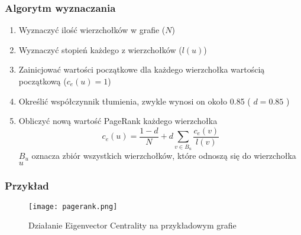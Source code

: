 \subsubsection{Algorytm wyznaczania}
\begin{enumerate}
\item Wyznaczyć ilość wierzchołków w grafie ($N$)
\item Wyznaczyć stopień każdego z wierzchołków ($l(u)$)
\item Zainicjować wartości początkowe dla każdego wierzchołka wartością początkową ($c_e(u) = 1$)
\item Określić współczynnik tłumienia, zwykle wynosi on około 0.85 ( $d = 0.85$ )
\item Obliczyć nową wartość PageRank każdego wierzchołka $$ c_e(u) = \frac{1 - d}{N} + d\sum_{v \in B_u} \frac{c_e(v)}{l(v)}$$ $B_u$ oznacza zbiór wszystkich wierzchołków, które odnoszą się do wierzchołka $u$
\end{enumerate}

\FloatBarrier
\subsubsection{Przykład}
\begin{figure}[h]
\centering
\texttt{[image: pagerank.png]}
\caption{Działanie Eigenvector Centrality  na przykładowym grafie}
\end{figure}
\FloatBarrier